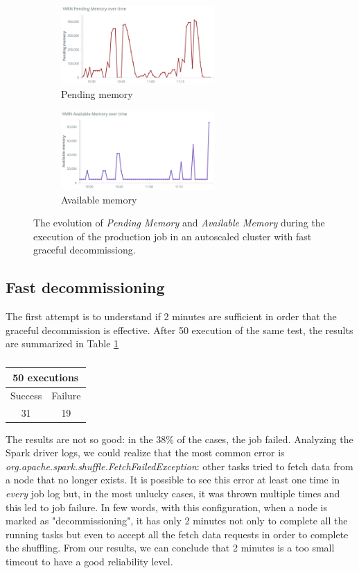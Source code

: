 \documentclass[12pt,twoside,cucitura]{toptesi}
\begin{document}
\begin{figure}
\centering
	\begin{subfigure}[b]{0.4\textwidth}
    \includegraphics[height=30mm]{down-p-memory}
	\caption{Pending memory}\label{fig:down-p-memory}
  \end{subfigure}
	\begin{subfigure}[b]{0.4\textwidth}
	\includegraphics[height=30mm]{down-a-memory}
	\caption{Available memory}\label{fig:down-a-memory}
	\end{subfigure}
	\caption{The evolution of \textit{Pending Memory} and \textit{Available Memory} during the execution of the production job in an autoscaled cluster with fast graceful decommissiong.}\label{fig:down-pa-memory}
\end{figure}

\subsection{Fast decommissioning}
The first attempt is to understand if 2 minutes are sufficient in order that the graceful decommission is effective. After 50 execution of the same test, the results are summarized in Table \ref{table:fast-down}

\begin{table}[]
\centering
\begin{tabular}{|c|c|}
\hline
\multicolumn{2}{|c|}{50 executions} \\ \hline
Success          & Failure          \\ \hline
31               & 19               \\ \hline
\end{tabular}
\caption{}\label{table:fast-down}
\end{table}

The results are not so good: in the 38\% of the cases, the job failed. Analyzing the Spark driver logs, we could realize that the most common error is \textit{org.apache.spark.shuffle.FetchFailedException}: other tasks tried to fetch data from a node that no longer exists. It is possible to see this error at least one time in \textit{every} job log but, in the most unlucky cases, it was thrown multiple times and this led to job failure. In few words, with this configuration, when a node is marked as "decommissioning", it has only 2 minutes not only to complete all the running tasks but even to accept all the fetch data requests in order to complete the shuffling. From our results, we can conclude that 2 minutes is a too small timeout to have a good reliability level.
\end{document}
